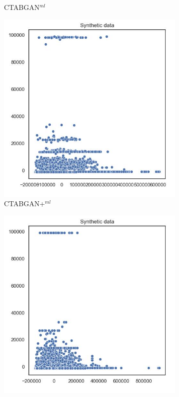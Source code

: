 \begin{figure}[h]
\begin{subfigure}{0.3\textwidth}
		\caption{CTABGAN$^{ml}$}
	\end{subfigure}
	\begin{subfigure}{0.3\textwidth}
		\centering
		\includegraphics[width=\textwidth]{images/pca/ctabgan+.jpg}
		\caption{CTABGAN+$^{ml}$}
	\end{subfigure}
	\begin{subfigure}{0.3\textwidth}
		\centering
		\includegraphics[width=\textwidth]{images/pca/smote.jpg}

\end{subfigure}
\end{figure}

